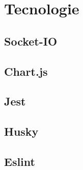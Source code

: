 \section{Tecnologie}

\subsection{Socket-IO}
\subsection{Chart.js}
\subsection{Jest}
\subsection{Husky}
\subsection{Eslint}